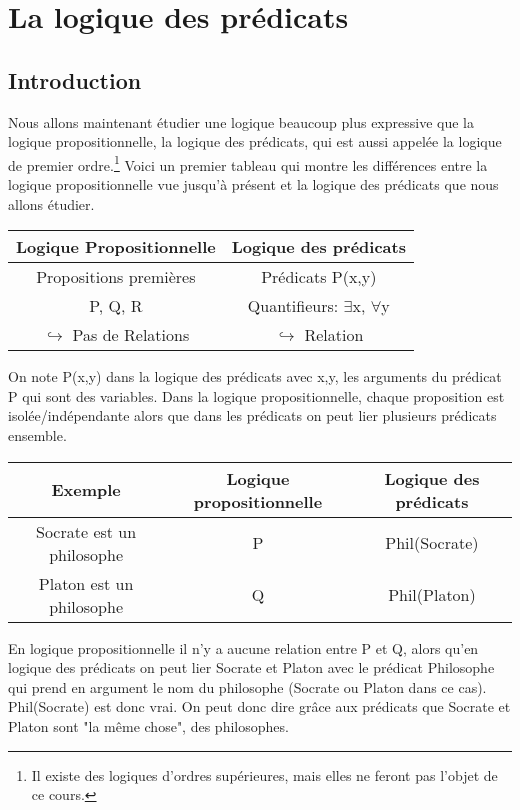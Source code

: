 \chapter{La logique des prédicats}
 
\section{Introduction}

Nous allons maintenant étudier une logique beaucoup plus expressive que la
logique propositionnelle, la logique des prédicats, qui est aussi appelée
la logique de premier ordre.\footnote{Il existe des logiques d'ordres supérieures,
mais elles ne feront pas l'objet de ce cours.}
Voici un premier tableau qui montre les différences entre la logique propositionnelle vue jusqu'à présent et la logique des prédicats que nous allons étudier.
\begin{center}
\begin{tabular}{|c|c|}
\hline 
Logique Propositionnelle & Logique des prédicats \\ 
\hline
Propositions premières & Prédicats P(x,y) \\ 
P, Q, R & Quantifieurs: $\exists$x, $\forall$y \\ 
$\hookrightarrow$ Pas de Relations & $\hookrightarrow$ Relation \\ 
\hline 
\end{tabular} 
\end{center}

On note P(x,y) dans la logique des prédicats avec x,y, les arguments du prédicat P qui sont des variables.
Dans la logique propositionnelle, chaque proposition est isolée/indépendante alors que dans les prédicats on peut lier plusieurs prédicats ensemble.


\begin{center}
\begin{tabular}{|c|c|c|}
\hline 
Exemple & Logique propositionnelle & Logique des prédicats \\ 
\hline 
Socrate est un philosophe & P & Phil(Socrate) \\ 
Platon est un philosophe & Q & Phil(Platon) \\ 
\hline 
\end{tabular} 
\end{center}

En logique propositionnelle il n'y a aucune relation entre P et Q, alors qu'en logique des prédicats on peut lier Socrate et Platon avec le prédicat Philosophe qui prend en argument le nom du philosophe (Socrate ou Platon dans ce cas). Phil(Socrate) est donc vrai. On peut donc dire grâce aux prédicats que Socrate et Platon sont "la même chose", des philosophes.\\

